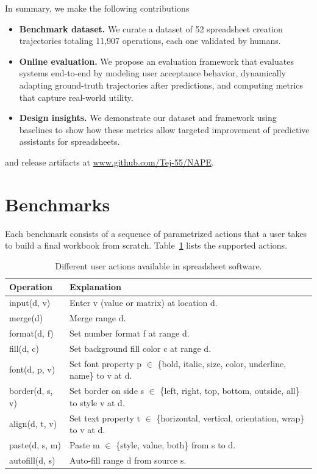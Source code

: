 \documentclass{article}
\theoremstyle{plain}
\theoremstyle{definition}
\theoremstyle{remark}
\begin{document}
In summary, we make the following contributions 
\begin{itemize}
    \item \textbf{Benchmark dataset.} We curate a dataset of 52 spreadsheet creation trajectories totaling 11,907 operations, each one validated by humans.
    \item \textbf{Online evaluation.} We propose an evaluation framework that evaluates systems end-to-end by modeling user acceptance behavior, dynamically adapting ground-truth trajectories after predictions, and computing metrics that capture real-world utility.
    \item \textbf{Design insights.} We demonstrate our dataset and framework using baselines to show how these metrics allow targeted improvement of predictive assistants for spreadsheets.
\end{itemize}
and release artifacts at {\small{\url{www.github.com/Tej-55/NAPE}}}.

\section{Benchmarks}
\label{sec:benchmark}

Each benchmark consists of a sequence of parametrized actions that a user takes to build a final workbook from scratch.
Table~\ref{tab:actions} lists the supported actions.

\begin{table}[]
    \centering
    \small
    \begin{tabularx}{\columnwidth}{lX}
    \toprule
    \textbf{Operation} & \textbf{Explanation} \\ \midrule
    \textsf{input(d, v)}        & Enter \textsf{v} (value or matrix) at location \textsf{d}.\\
    \textsf{merge(d)} & Merge range \textsf{d}.\\
    \textsf{format(d, f)}       & Set number format \textsf{f} at range \textsf{d}. \\
    \textsf{fill(d, c)}         & Set background fill color \textsf{c} at range \textsf{d}. \\
    \textsf{font(d, p, v)}      & Set font property \textsf{p} $\in$ \{bold, italic, size, color, underline, name\} to \textsf{v} at \textsf{d}. \\
    \textsf{border(d, s, v)}    & Set border on side \textsf{s} $\in$ \{left, right, top, bottom, outside, all\} to style \textsf{v} at \textsf{d}. \\
    \textsf{align(d, t, v)}     & Set text property \textsf{t} $\in$ \{horizontal, vertical, orientation, wrap\} to \textsf{v} at \textsf{d}. \\
    \textsf{paste(d, s, m)} & Paste \textsf{m} $\in$ \{style, value, both\} from \textsf{s} to \textsf{d}. \\
    \textsf{autofill(d, s)}  & Auto-fill range \textsf{d} from source \textsf{s}. \\
    \bottomrule
    \end{tabularx}
    \caption{Different user actions available in spreadsheet software.}
    \label{tab:actions}
\end{table}
\end{document}

